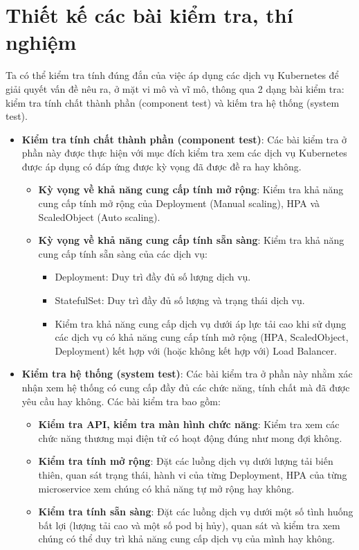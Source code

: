 \section{Thiết kế các bài kiểm tra, thí nghiệm}
\noindent Ta có thể kiểm tra tính đúng đắn của việc áp dụng các dịch vụ Kubernetes để giải quyết vấn đề nêu ra, ở mặt vi mô và vĩ mô, thông qua 2 dạng bài kiểm tra: kiểm tra tính chất thành phần (component test) và kiếm tra hệ thống (system test).
\begin{itemize}
  \item \textbf{Kiểm tra tính chất thành phần (component test)}: Các bài kiểm tra ở phần này được thực hiện với mục đích kiểm tra xem các dịch vụ Kubernetes được áp dụng có đáp ứng được kỳ vọng đã được đề ra hay không.
  \begin{itemize}
    \item \textbf{Kỳ vọng về khả năng cung cấp tính mở rộng}: Kiểm tra khả năng cung cấp tính mở rộng của Deployment (Manual scaling), HPA và ScaledObject (Auto scaling).
    \item \textbf{Kỳ vọng về khả năng cung cấp tính sẵn sàng}: Kiểm tra khả năng cung cấp tính sẵn sàng của các dịch vụ:
    \begin{itemize}
      \item Deployment: Duy trì đầy đủ số lượng dịch vụ.
      \item StatefulSet: Duy trì đầy đủ số lượng và trạng thái dịch vụ.
      \item Kiểm tra khả năng cung cấp dịch vụ dưới áp lực tải cao khi sử dụng các dịch vụ có khả năng cung cấp tính mở rộng (HPA, ScaledObject, Deployment) kết hợp với (hoặc không kết hợp với) Load Balancer.
    \end{itemize}
  \end{itemize}
  \item \textbf{Kiểm tra hệ thống (system test)}: Các bài kiểm tra ở phần này nhằm xác nhận xem hệ thống có cung cấp đầy đủ các chức năng, tính chất mà đã được yêu cầu hay không. Các bài kiểm tra bao gồm:
  \begin{itemize}
    \item \textbf{Kiểm tra API, kiểm tra màn hình chức năng}: Kiểm tra xem các chức năng thương mại điện tử có hoạt động đúng như mong đợi không.
    \item \textbf{Kiểm tra tính mở rộng}: Đặt các luồng dịch vụ dưới lượng tải biến thiên, quan sát trạng thái, hành vi của từng Deployment, HPA của từng microservice xem chúng có khả năng tự mở rộng hay không.
    \item \textbf{Kiểm tra tính sẵn sàng}: Đặt các luồng dịch vụ dưới một số tình huống bất lợi (lượng tải cao và một số pod bị hủy), quan sát và kiểm tra xem chúng có thể duy trì khả năng cung cấp dịch vụ của mình hay không.
  \end{itemize}
\end{itemize}
